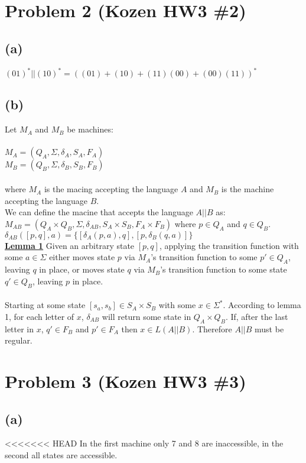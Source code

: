\documentclass[11pt, a4paper, oneside]{article}
\begin{document}
\section*{Problem 2 (Kozen HW3 \#2)}
\subsection*{(a)}
$(01)^* || (10)^* = ((01) + (10) + (11)(00) + (00)(11))^*$

\subsection*{(b)}
Let $M_A$ and $M_B$ be machines: \\
\\
$M_A = (Q_A, \Sigma, \delta _A, S_A, F_A)$\\
$M_B = (Q_B, \Sigma, \delta _B, S_B, F_B)$\\
\\
where $M_A$ is the macing accepting the language $A$ and $M_B$ is the machine
accepting the language $B$. \\
We can define the macine that accepts the language $A||B$ as: \\

$M_{AB} = (Q_A \times Q_B, \Sigma, \delta _{AB}, S_A \times S_B, F_A \times F_B)$ 
where $p \in Q_A$ and $q \in Q_B$. \\

$\delta _{AB} ([p,q],a) = \{[\delta _A (p,a),q],[p, \delta _B (q,a)]\}$\\

\textbf{\underline{Lemma 1}}
Given an arbitrary state $[p,q]$, applying the transition function with 
some $a \in \Sigma$ either moves state $p$ via $M_A$'s transition function
to some $p' \in Q_A$, leaving $q$ in place, or moves state $q$ via $M_B$'s
transition function to some state $q' \in Q_B$, leaving $p$ in place.\\
\\
Starting at some state $[s_a, s_b] \in S_A \times S_B$ with some $x \in \Sigma^*$.
According to lemma 1, for each letter of $x$, $\delta _{AB}$ will return some 
state in $Q_A \times Q_B$. If, after the last letter in $x$, $q' \in F_B$ and 
$p' \in F_A$ then $x \in L(A||B)$. Therefore $A||B$ must be regular.


\section*{Problem 3 (Kozen HW3 \#3)}
\subsection*{(a)}
<<<<<<< HEAD
In the first machine only 7 and 8 are inaccessible, in the second all states 
are accessible.
\end{document}
